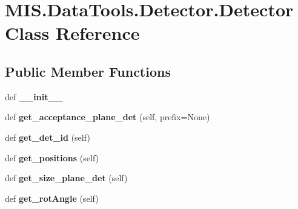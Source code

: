 \hypertarget{classMIS_1_1DataTools_1_1Detector_1_1Detector}{}\section{M\+I\+S.\+Data\+Tools.\+Detector.\+Detector Class Reference}
\label{classMIS_1_1DataTools_1_1Detector_1_1Detector}
\subsection*{Public Member Functions}
\begin{DoxyCompactItemize}
\item 
\mbox{\label{classMIS_1_1DataTools_1_1Detector_1_1Detector_af54aadc753b2790b16285eb266f12a57}} 
def {\bfseries \+\_\+\+\_\+init\+\_\+\+\_\+}
\item 
\mbox{\label{classMIS_1_1DataTools_1_1Detector_1_1Detector_a39d43c4cb1908d00a639e76d154e3569}} 
def {\bfseries get\+\_\+acceptance\+\_\+plane\+\_\+det} (self, prefix=None)
\item 
\mbox{\label{classMIS_1_1DataTools_1_1Detector_1_1Detector_afacfcd78267ac3cf0d8a878a0475b1c8}} 
def {\bfseries get\+\_\+det\+\_\+id} (self)
\item 
\mbox{\label{classMIS_1_1DataTools_1_1Detector_1_1Detector_acd8c86b5e47f2c4d0b8dd135bc2a9f30}} 
def {\bfseries get\+\_\+positions} (self)
\item 
\mbox{\label{classMIS_1_1DataTools_1_1Detector_1_1Detector_a6551da095c20145e4880774e9f794286}} 
def {\bfseries get\+\_\+size\+\_\+plane\+\_\+det} (self)
\item 
\mbox{\label{classMIS_1_1DataTools_1_1Detector_1_1Detector_a7985b53ca60727ebd21d49cd6a83470d}} 
def {\bfseries get\+\_\+rot\+Angle} (self)
\item 
\mbox{\label{classMIS_1_1DataTools_1_1Detector_1_1Detector_ae9b0c2343bcc909794496aa77779feb1}} 

\end{DoxyCompactItemize}
